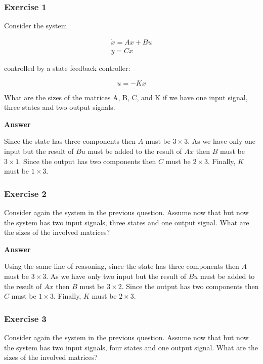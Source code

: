 \subsubsection{Exercise 1}

Consider the system 

\begin{eqnarray}
\dot{x} = Ax + Bu \\
y = Cx 
\end{eqnarray}

controlled by a state feedback controller: 

\begin{equation}
 u = -Kx  
\end{equation}

What are  the sizes of the matrices A, B, C, and K if we have one input signal, three states and two output signals.

\textbf{Answer}

Since the state has three components then $A$ must be $3\times 3$. As we have only one input but the result of $Bu$ must be added to the result of $Ax$ then $B$ must be $3\times 1$.
Since the output has two components then $C$ must be $2\times 3$. Finally, $K$ must be $1\times 3$.

\subsubsection{Exercise 2}

Consider again the system in the previous  question. Assume now that but now the system has two input signals, three states and one output signal. What are the sizes of the involved matrices?

\textbf{Answer}

Using the same line of reasoning, since the state has three components then $A$ must be $3\times 3$. As we have only two input but the result of $Bu$ must be added to the result of $Ax$ then $B$ must be $3\times 2$. Since the output has two components then $C$ must be $1\times 3$. Finally, $K$ must be $2\times 3$.

\subsubsection{Exercise 3}

Consider again the system in the previous  question. Assume now that but now the system has two input signals, four states and one output signal. What are the sizes of the involved matrices?

